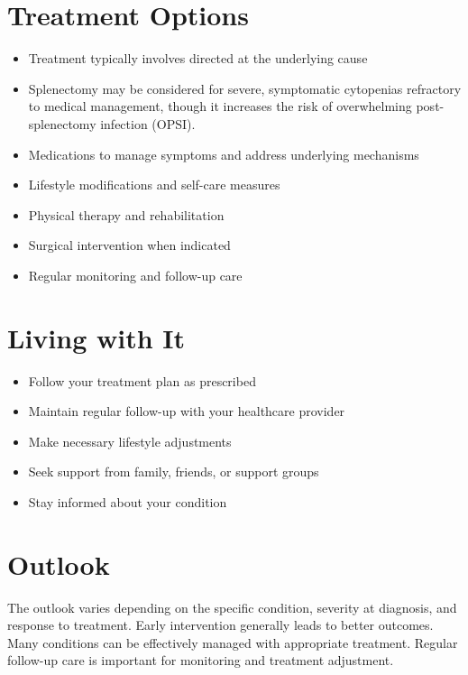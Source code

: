 \section{Treatment Options}
\begin{itemize}[noitemsep]
  \item Treatment typically involves directed at the underlying cause
  \item Splenectomy may be considered for severe, symptomatic cytopenias refractory to medical management, though it increases the risk of overwhelming post-splenectomy infection (OPSI).
  \item Medications to manage symptoms and address underlying mechanisms
  \item Lifestyle modifications and self-care measures
  \item Physical therapy and rehabilitation
  \item Surgical intervention when indicated
  \item Regular monitoring and follow-up care
\end{itemize}
\section{Living with It}
\begin{itemize}[noitemsep]
  \item Follow your treatment plan as prescribed
  \item Maintain regular follow-up with your healthcare provider
  \item Make necessary lifestyle adjustments
  \item Seek support from family, friends, or support groups
  \item Stay informed about your condition
\end{itemize}
\section{Outlook}
The outlook varies depending on the specific condition, severity at diagnosis, and response to treatment. Early intervention generally leads to better outcomes. Many conditions can be effectively managed with appropriate treatment. Regular follow-up care is important for monitoring and treatment adjustment.
